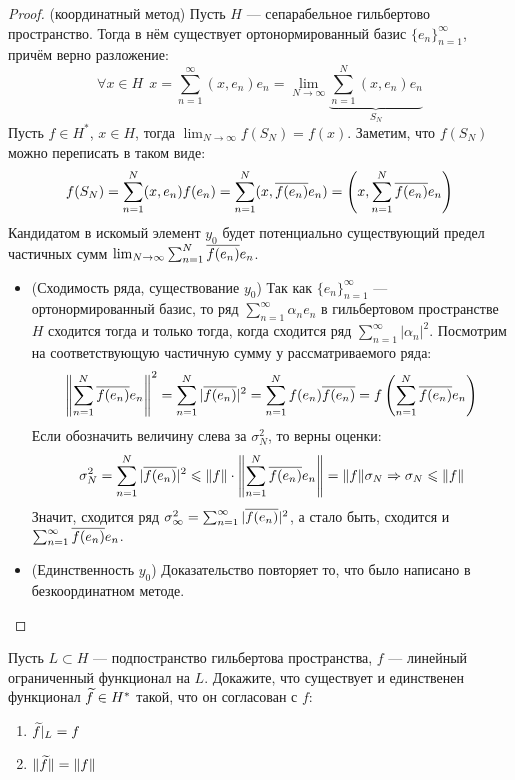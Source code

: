 \begin{proof} (координатный метод)
	Пусть $H$ --- сепарабельное гильбертово пространство. Тогда в нём существует ортонормированный базис $\{e_n\}_{n = 1}^\infty$, причём верно разложение:
	\[
		\forall x \in H\ \ x = \sum_{n = 1}^\infty (x, e_n)e_n = \lim_{N \to \infty} \underbrace{\sum_{n = 1}^N (x, e_n)e_n}_{S_N}
	\]
	Пусть $f \in H^*$, $x \in H$, тогда $\lim_{N \to \infty} f(S_N) = f(x)$. Заметим, что $f(S_N)$ можно переписать в таком виде:
	\[
		f(S_N) = \sum_{n = 1}^N (x, e_n)f(e_n) = \sum_{n = 1}^N (x, \overline{f(e_n)}e_n) = \left(x, \sum_{n = 1}^N \overline{f(e_n)}e_n\right)
	\]
	Кандидатом в искомый элемент $y_0$ будет потенциально существующий предел частичных сумм $\lim_{N \to \infty} \sum_{n = 1}^N \overline{f(e_n)}e_n$.
	\begin{itemize}
		\item (Сходимость ряда, существование $y_0$) Так как $\{e_n\}_{n = 1}^\infty$ --- ортонормированный базис, то ряд $\sum_{n = 1}^\infty \alpha_n e_n$ в гильбертовом пространстве $H$ сходится тогда и только тогда, когда сходится ряд $\sum_{n = 1}^\infty |\alpha_n|^2$. Посмотрим на соответствующую частичную сумму у рассматриваемого ряда:
		\[
			\left\|\sum_{n = 1}^N \overline{f(e_n)}e_n\right\|^2 = \sum_{n = 1}^N |\overline{f(e_n)}|^2 = \sum_{n = 1}^N f(e_n)\overline{f(e_n)} = f\left(\sum_{n = 1}^N \overline{f(e_n)}e_n\right)
		\]
		Если обозначить величину слева за $\sigma_N^2$, то верны оценки:
		\[
			\sigma_N^2 = \sum_{n = 1}^N |\overline{f(e_n)}|^2 \leqslant \|f\| \cdot \left\|\sum_{n = 1}^N \overline{f(e_n)}e_n\right\| = \|f\|\sigma_N \Rightarrow \sigma_N \leqslant \|f\|
		\]
		Значит, сходится ряд $\sigma_\infty^2 = \sum_{n = 1}^\infty |\overline{f(e_n)}|^2$, а стало быть, сходится и $\sum_{n = 1}^\infty \overline{f(e_n)}e_n$.
		
		\item (Единственность $y_0$) Доказательство повторяет то, что было написано в безкоординатном методе.
	\end{itemize}
\end{proof}

\begin{exercise}
	Пусть $L \subset H$ --- подпостранство гильбертова пространства, $f$ --- линейный ограниченный функционал на $L$. Докажите, что существует и единственен функционал $\widetilde{f} \in H^*$ такой, что он согласован с $f$:
	\begin{enumerate}
		\item $\widetilde{f}|_L = f$
		
		\item $\|\widetilde{f}\| = \|f\|$
	\end{enumerate}
\end{exercise}

